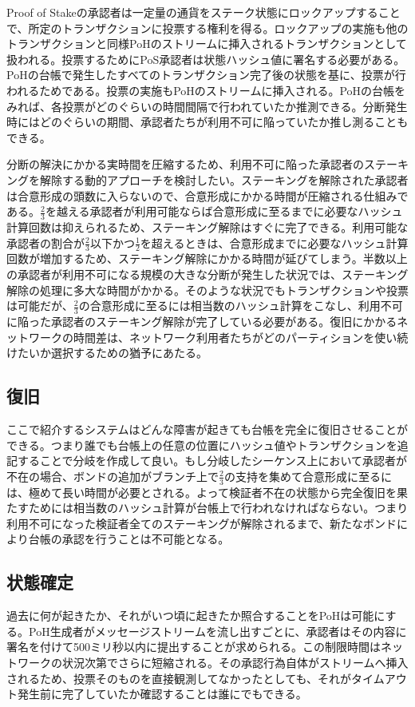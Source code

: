 \documentclass[12pt]{ltjsarticle}
\begin{document}
Proof of Stakeの承認者は一定量の通貨をステーク状態にロックアップすることで、所定のトランザクションに投票する権利を得る。ロックアップの実施も他のトランザクションと同様PoHのストリームに挿入されるトランザクションとして扱われる。投票するためにPoS承認者は状態ハッシュ値に署名する必要がある。PoHの台帳で発生したすべてのトランザクション完了後の状態を基に、投票が行われるためである。投票の実施もPoHのストリームに挿入される。PoHの台帳をみれば、各投票がどのぐらいの時間間隔で行われていたか推測できる。分断発生時にはどのぐらいの期間、承認者たちが利用不可に陥っていたか推し測ることもできる。

分断の解決にかかる実時間を圧縮するため、利用不可に陥った承認者のステーキングを解除する動的アプローチを検討したい。ステーキングを解除された承認者は合意形成の頭数に入らないので、合意形成にかかる時間が圧縮される仕組みである。\(\frac{2}{3}\)を越える承認者が利用可能ならば合意形成に至るまでに必要なハッシュ計算回数は抑えられるため、ステーキング解除はすぐに完了できる。利用可能な承認者の割合が\(\frac{2}{3}\)以下かつ\(\frac{1}{2}\)を超えるときは、合意形成までに必要なハッシュ計算回数が増加するため、ステーキング解除にかかる時間が延びてしまう。半数以上の承認者が利用不可になる規模の大きな分断が発生した状況では、ステーキング解除の処理に多大な時間がかかる。そのような状況でもトランザクションや投票は可能だが、\(\frac{2}{3}\)の合意形成に至るには相当数のハッシュ計算をこなし、利用不可に陥った承認者のステーキング解除が完了している必要がある。復旧にかかるネットワークの時間差は、ネットワーク利用者たちがどのパーティションを使い続けたいか選択するための猶予にあたる。

\subsection{復旧}
ここで紹介するシステムはどんな障害が起きても台帳を完全に復旧させることができる。つまり誰でも台帳上の任意の位置にハッシュ値やトランザクションを追記することで分岐を作成して良い。もし分岐したシーケンス上において承認者が不在の場合、ボンドの追加がブランチ上で\(\frac{2}{3}\)の支持を集めて合意形成に至るには、極めて長い時間が必要とされる。よって検証者不在の状態から完全復旧を果たすためには相当数のハッシュ計算が台帳上で行われなければならない。つまり利用不可になった検証者全てのステーキングが解除されるまで、新たなボンドにより台帳の承認を行うことは不可能となる。

\subsection{状態確定}
過去に何が起きたか、それがいつ頃に起きたか照合することをPoHは可能にする。PoH生成者がメッセージストリームを流し出すごとに、承認者はその内容に署名を付けて500ミリ秒以内に提出することが求められる。この制限時間はネットワークの状況次第でさらに短縮される。その承認行為自体がストリームへ挿入されるため、投票そのものを直接観測してなかったとしても、それがタイムアウト発生前に完了していたか確認することは誰にでもできる。
\end{document}
